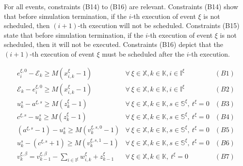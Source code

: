 \documentclass[]{interact}
\theoremstyle{plain}%
\theoremstyle{definition}
\theoremstyle{remark}
\begin{document}
For all events, constraints (B14) to (B16) are relevant. Constraints (B14) show that before simulation termination, if the $i$-th execution of event $\xi$ is not scheduled, then $(i+1)$-th execution will not be scheduled. Constraints (B15) state that before simulation termination, if the $i$-th execution of event $\xi$ is not scheduled, then it will not be executed. Constraints (B16) depict that the $(i+1)$-th execution of event $\xi$ must be scheduled after the $i$-th execution.


\begin{eqnarray}
e^{\xi,0}_i-\mathcal{E}_{k} \ge M(x^{\xi}_{i,k}-1)& \forall\ \xi\in \mathbb{X},k\in \mathbb{K},i\in \mathbb{I}^{\xi}&(B1)\nonumber\\
\mathcal{E}_{k} -e^{\xi,0}_i\ge M(x^{\xi}_{i,k}-1)&\forall\ \xi\in \mathbb{X},k\in \mathbb{K},i\in \mathbb{I}^{\xi}&(B2)\nonumber\\
u^s_k - a^{\xi,s} \ge M(z^{\xi}_{k}-1)&\forall\ \xi\in \mathbb{X},k\in \mathbb{K},s\in \mathbb{S^{\xi}},\ t^{\xi} = 0&(B3)\nonumber\\
c^{\xi,s} - u^s_k \ge M(z^{\xi}_{k}-1)&\forall\ \xi\in \mathbb{X},k\in \mathbb{K},s\in \mathbb{S^{\xi}},\ t^{\xi} = 0&(B4)\nonumber\\
( a^{\xi,s}-1) - u^s_k \ge M(v^{\xi,s,0}_k-1) & \forall\ \xi\in \mathbb{X},k\in \mathbb{K},s\in \mathbb{S^{\xi}},\ t^{\xi} = 0 &(B5)\nonumber\\
u^s_k -  (c^{\xi,s}+1) \ge M(v^{\xi,s,1}_k-1) & \forall\ \xi\in \mathbb{X},k\in \mathbb{K},s\in \mathbb{S^{\xi}},\ t^{\xi} = 0 &(B6)\nonumber\\
v^{\xi,\beta}_k = v^{\xi,\beta}_{k-1} - \sum_{i\in \mathbb{I}^{\xi}}w^{\xi}_{i,k} + z^{\xi}_{k-1} & \forall\ \xi\in \mathbb{X},k\in \mathbb{K},\ t^{\xi} = 0 &(B7)\nonumber\\

\end{eqnarray}
\end{document}
